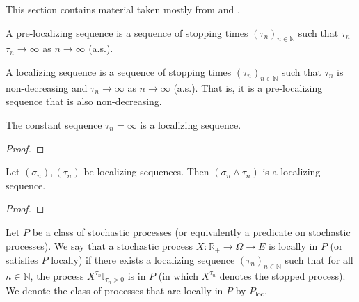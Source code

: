 This section contains material taken mostly from \cite[Chapters 10 and 18]{kallenberg2021} and \cite{almostsuremath}.


\begin{definition}\label{def:preLocalizingSequence}
  \leanok
A pre-localizing sequence is a sequence of stopping times $(\tau_n)_{n \in \mathbb{N}}$ such that $\tau_n$ $\tau_n \to \infty$ as $n \to \infty$ (a.s.).
\end{definition}


\begin{definition}\label{def:localizingSequence}
  \leanok
A localizing sequence is a sequence of stopping times $(\tau_n)_{n \in \mathbb{N}}$ such that $\tau_n$ is non-decreasing and $\tau_n \to \infty$ as $n \to \infty$ (a.s.).
That is, it is a pre-localizing sequence that is also non-decreasing.
\end{definition}


\begin{lemma}\label{lem:localizingSequence_const_top}
  \leanok
The constant sequence $\tau_n = \infty$ is a localizing sequence.
\end{lemma}

\begin{proof}\leanok

\end{proof}


\begin{lemma}\label{lem:localizingSequence_min}
  \leanok
Let $(\sigma_n), (\tau_n)$ be localizing sequences.
Then $(\sigma_n \wedge \tau_n)$ is a localizing sequence.
\end{lemma}

\begin{proof}\leanok

\end{proof}


\begin{definition}\label{def:locally}
  \leanok
Let $P$ be a class of stochastic processes (or equivalently a predicate on stochastic processes).
We say that a stochastic process $X : \mathbb{R}_+ \to \Omega \to E$ is locally in $P$ (or satisfies $P$ locally) if there exists a localizing sequence $(\tau_n)_{n \in \mathbb{N}}$ such that for all $n \in \mathbb{N}$, the process $X^{\tau_n}\mathbb{I}_{\tau_n > 0}$ is in $P$ (in which $X^{\tau_n}$ denotes the stopped process).
We denote the class of processes that are locally in $P$ by $P_{\mathrm{loc}}$.
\end{definition}


